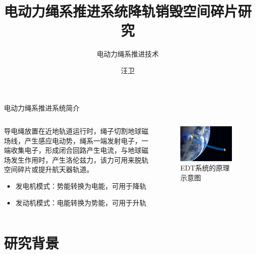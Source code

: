 \documentclass[sectioncirclenumberstyle]{le2iutbmbeamer}
\title{电动力绳系推进系统降轨销毁空间碎片研究}
\subtitle{ 电动力绳系推进技术}
\author[汪卫]{汪卫}
\institute[BIT]{北京理工大学宇航学院}
\begin{document}
\begin{frame}{电动力绳系推进系统简介}
\begin{columns}
	\begin{column}{.5\linewidth}
		导电绳放置在近地轨道运行时，绳子切割地球磁场线，产生感应电动势，绳系一端发射电子，一端收集电子，形成闭合回路产生电流，与地球磁场发生作用时，产生洛伦兹力，该力可用来脱轨空间碎片或提升航天器轨道。
		\begin{itemize}
			\item 发电机模式：势能转换为电能，可用于降轨
			\item 发动机模式：电能转换为势能，可用于升轨
		\end{itemize}
	\end{column}
	\begin{column}{.5\linewidth}
		\begin{center}
			\begin{figure}
				\includegraphics[width=\linewidth]{figures/EDTbasci}
				\caption{EDT系统的原理示意图}
			\end{figure}
		\end{center}
	\end{column}
\end{columns}
\end{frame}


\tableofcontentslide

\section{研究背景}
\tableofcontentslide[sectionstyle={show/shaded},subsectionstyle={show/show/hide},subsubsectionstyle={hide/hide/hide/hide}]
\end{document}
